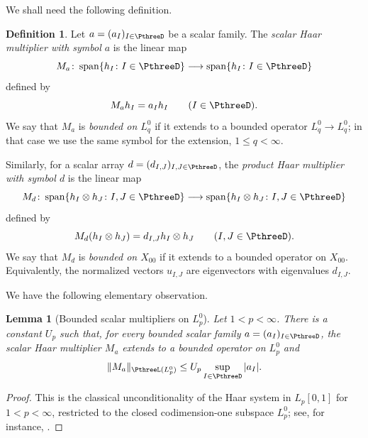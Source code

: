 \documentclass[11pt,reqno]{amsart}
\makeatletter
\theoremstyle{plain}
\newtheorem{lemma}[lemma]{Lemma}
\theoremstyle{definition}
\newtheorem{definition}[definition]{Definition}
\newcounter{problempaper}
\newenvironment{problempaperbody}{%
  \setcounter{subsection}{0}%
  \setcounter{subsubsection}{0}%
  \setcounter{paragraph}{0}%
  \renewcommand{\thesubsection}{\arabic{subsection}}%
  \renewcommand{\thesubsubsection}{\thesubsection.\arabic{subsubsection}}%
  \renewcommand{\theparagraph}{\thesubsubsection.\arabic{paragraph}}%
  \let\problem@outersection\section
  \let\problem@outersubsection\subsection
  \let\problem@outersubsubsection\subsubsection
  \let\problem@outerparagraph\paragraph
  \let\section\problem@papersection
  \let\subsection\problem@papersubsection
  \let\subsubsection\problem@papersubsubsection
}{%
  \let\section\problem@outersection
  \let\subsection\problem@outersubsection
  \let\subsubsection\problem@outersubsubsection
  \let\paragraph\problem@outerparagraph
}
\newcommand{\problem@target}[2]{%
  \hypertarget{problem-\theproblempaper-#1-#2}{}%
}
\newcommand{\problem@paperheading}[3]{%
  \par\bigskip
  \problem@target{#1}{#2}%
  \noindent{\large\bfseries #2.\quad #3\par}%
  \nobreak\smallskip
}
\newcommand{\problem@papersubheading}[3]{%
  \par\medskip
  \problem@target{#1}{#2}%
  \noindent{\normalsize\bfseries #2.\quad #3\par}%
  \nobreak\smallskip
}
\newcommand{\problem@papersubsubheading}[3]{%
  \par\smallskip
  \problem@target{#1}{#2}%
  \noindent{\normalsize\itshape #2.\quad #3.\ }%
}
\def\problem@papersection{%
  \@ifstar{\problem@papersectionstar}{\problem@papersectionnostar}%
}
\def\problem@papersectionstar#1{%
  \par\bigskip\noindent{\large\bfseries #1\par}\nobreak\smallskip
}
\def\problem@papersectionnostar#1{%
  \refstepcounter{subsection}%
  \setcounter{subsubsection}{0}%
  \setcounter{paragraph}{0}%
  \problem@paperheading{section}{\thesubsection}{#1}%
  \problem@writecontentsline{section}{\thesubsection}{#1}%
}
\def\problem@papersubsection{%
  \@ifstar{\problem@papersubsectionstar}{\problem@papersubsectionnostar}%
}
\def\problem@papersubsectionstar#1{%
  \par\medskip\noindent{\normalsize\bfseries #1\par}\nobreak\smallskip
}
\def\problem@papersubsectionnostar#1{%
  \refstepcounter{subsubsection}%
  \setcounter{paragraph}{0}%
  \problem@papersubheading{subsection}{\thesubsubsection}{#1}%
  \problem@writecontentsline{subsection}{\thesubsubsection}{#1}%
}
\def\problem@papersubsubsection{%
  \@ifstar{\problem@papersubsubsectionstar}{\problem@papersubsubsectionnostar}%
}
\def\problem@papersubsubsectionstar#1{%
  \par\smallskip\noindent{\normalsize\itshape #1.\ }%
}
\def\problem@papersubsubsectionnostar#1{%
  \refstepcounter{paragraph}%
  \problem@papersubsubheading{subsubsection}{\theparagraph}{#1}%
  \problem@writecontentsline{subsubsection}{\theparagraph}{#1}%
}
\newcommand{\problem@writecontentsline}[3]{%
  \begingroup
  \protected@write\@auxout{}{%
    \string\problemcontentsentry{\theproblempaper}{#1}{#2}{#3}{\thepage}%
  }%
  \endgroup
}
\newcommand{\problemcontentsentry}[5]{%
  \@ifundefined{problemcontents@#1}{%
    \expandafter\gdef\csname problemcontents@#1\endcsname{}%
  }{}%
  \expandafter\g@addto@macro\csname problemcontents@#1\endcsname{%
    \problemcontentsline{#1}{#2}{#3}{#4}{#5}%
  }%
}
\newcommand{\problemcontentslink}[4]{%
  \hyperlink{problem-#1-#2-#3}{#4}%
}
\newcommand{\problemcontentsline}[5]{%
  \ifstrequal{#2}{section}{%
    \par\noindent
    \problemcontentslink{#1}{#2}{#3}{\makebox[2.5em][l]{#3}#4}%
    \nobreak\dotfill
    \problemcontentslink{#1}{#2}{#3}{#5}\par
  }{%
    \ifstrequal{#2}{subsection}{%
      \par\noindent\hspace*{1.5em}%
      \problemcontentslink{#1}{#2}{#3}{\makebox[3.5em][l]{#3}#4}%
      \nobreak\dotfill
      \problemcontentslink{#1}{#2}{#3}{#5}\par
    }{%
      \par\noindent\hspace*{3em}%
      \problemcontentslink{#1}{#2}{#3}{\makebox[4.5em][l]{#3}#4}%
      \nobreak\dotfill
      \problemcontentslink{#1}{#2}{#3}{#5}\par
    }%
  }%
}
\makeatother
\begin{document}
\begin{problempaperbody}
We shall need the following definition.

\begin{definition}
Let $a=(a_I)_{I\in\PthreeD}$ be a scalar family. The \emph{scalar Haar multiplier with symbol $a$} is the linear map
\begin{equation*}
        M_a\colon \operatorname{span}\{h_I\colon I\in\PthreeD\}\longrightarrow
        \operatorname{span}\{h_I\colon I\in\PthreeD\}
\end{equation*}
defined by
\begin{equation*}
        M_a h_I=a_Ih_I\qquad (I\in\PthreeD).
\end{equation*}
We say that $M_a$ is \emph{bounded on $L_q^0$} if it extends to a bounded operator $L_q^0\to L_q^0$; in that case we use the same symbol for the extension, $1 \leq q < \infty$.

Similarly, for a scalar array $d=(d_{I,J})_{I,J\in\PthreeD}$, the \emph{product Haar multiplier with symbol $d$} is the linear map
\begin{equation*}
        M_d\colon \operatorname{span}\{h_I\otimes h_J\colon I,J\in\PthreeD\}\longrightarrow
        \operatorname{span}\{h_I\otimes h_J\colon I,J\in\PthreeD\}
\end{equation*}
defined by
\begin{equation*}
        M_d(h_I\otimes h_J)=d_{I,J}h_I\otimes h_J
        \qquad (I,J\in\PthreeD).
\end{equation*}
We say that $M_d$ is \emph{bounded on $X_{00}$} if it extends to a bounded operator on $X_{00}$. Equivalently, the normalized vectors $u_{I,J}$ are eigenvectors with eigenvalues $d_{I,J}$.
\end{definition}

We have the following elementary observation.

\begin{lemma}[Bounded scalar multipliers on $L_p^0$]
\label{p3:lem:lp-haar-multiplier}
Let $1<p<\infty$. There is a constant $U_p$ such that, for every bounded scalar family $a=(a_I)_{I\in\PthreeD}$, the scalar Haar multiplier $M_a$ extends to a bounded operator on $L_p^0$ and
\begin{equation*}
        \|M_a\|_{\PthreeL(L_p^0)}\leq U_p\sup_{I\in\PthreeD}|a_I|.
\end{equation*}
\end{lemma}

\begin{proof}
This is the classical unconditionality of the Haar system in $L_p[0,1]$ for $1<p<\infty$, restricted to the closed codimension-one subspace $L_p^0$; see, for instance, \cite[Chapter~6]{AlbiacKalton2016}.
\end{proof}


\end{problempaperbody}
\end{document}
